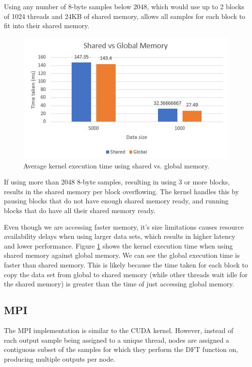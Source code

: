 \documentclass[11pt,a4paper]{article}
\begin{document}
Using any number of 8-byte samples below 2048, which would use up to 2 blocks of 1024 threads and 24KB of shared memory, allows all samples for each block to fit into their shared memory. 

\begin{figure}
\begin{center}
\includegraphics[scale=0.6]{shared_vs_global_graph}
\end{center}
\caption{Average kernel execution time using shared vs. global memory.}
\label{fig:shared_vs_global_graph}
\end{figure}

If using more than 2048 8-byte samples, resulting in using 3 or more blocks, results in the shared memory per block overflowing. The kernel handles this by pausing blocks that do not have enough shared memory ready, and running blocks that do have all their shared memory ready.
 
Even though we are accessing faster memory, it's size limitations causes resource availability delays when using larger data sets, which results in higher latency and lower performance. Figure \ref{fig:shared_vs_global_graph} shows the kernel execution time when using shared memory against global memory. We can see the global execution time is faster than shared memory. This is likely because the time taken for each block to copy the data set from global to shared memory (while other threads wait idle for the shared memory) is greater than the time of just accessing global memory.


\subsection{MPI}
The MPI implementation is similar to the CUDA kernel. However, instead of each output sample being assigned to a unique thread, nodes are assigned a contiguous subset of the samples for which they perform the DFT function on, producing multiple outputs per node.
\end{document}
